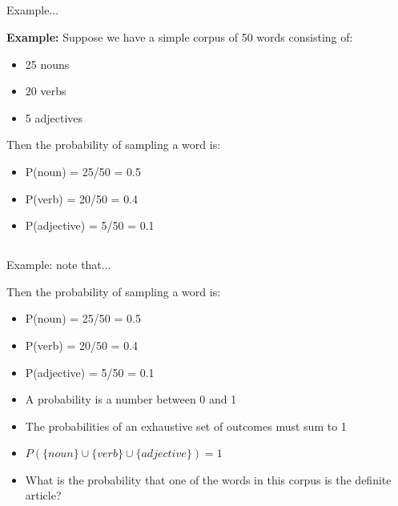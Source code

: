 \documentclass[9pt,xcolor=pdftex,dvipsnames,table]{beamer}
\begin{document}
\subsection{}
\begin{frame}{Example...}

{\large \textbf{Example:} Suppose we have a simple corpus of 50 words consisting of:}

\begin{itemize}
	\item 25 nouns
	\item 20 verbs
	\item 5 adjectives
\end{itemize}
\vspace{.25cm}

Then the probability of sampling a word is:
\begin{itemize}
	\item P({noun}) = 25/50 = 0.5
	\item P({verb}) = 20/50 = 0.4
	\item P({adjective}) = 5/50 = 0.1
\end{itemize}
\vspace{.25cm}

\end{frame}

\subsection{}
\begin{frame}{Example: note that...}

Then the probability of sampling a word is:
\begin{itemize}
	\item P({noun}) = 25/50 = 0.5
	\item P({verb}) = 20/50 = 0.4
	\item P({adjective}) = 5/50 = 0.1
\end{itemize}
\vspace{.25cm}

\begin{itemize}
     \item A probability is a number between 0 and 1
     \item The probabilities of an exhaustive set of outcomes must sum to 1
     \item $P(\{noun\} \cup \{verb\} \cup \{adjective\}) = 1$
     \item What is the probability that one of the words in this corpus is the definite article?
\end{itemize}
\end{frame}
\end{document}
